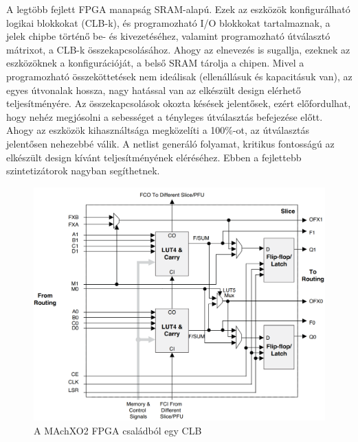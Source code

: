 \documentclass[a4paper,12pt,oneside]{book}
\begin{document}
A legtöbb fejlett FPGA manapság SRAM-alapú. Ezek az eszközök konfigurálható logikai blokkokat (CLB-k), és programozható I/O blokkokat tartalmaznak, a jelek chipbe történő be- és kivezetéséhez, valamint programozható útválasztó mátrixot, a CLB-k összekapcsolásához. Ahogy az elnevezés is sugallja, ezeknek az eszközöknek a konfigurációját, a belső SRAM tárolja a chipen. Mivel a programozható összeköttetések nem ideálisak (ellenállásuk és kapacitásuk van), az egyes útvonalak hossza, nagy hatással van az elkészült design elérhető teljesítményére. Az összekapcsolások okozta késések jelentősek, ezért előfordulhat, hogy nehéz megjósolni a sebességet a tényleges útválasztás befejezése előtt. Ahogy az eszközök kihasználtsága megközelíti a 100\%-ot, az útválasztás jelentősen nehezebbé válik. A netlist generáló folyamat, kritikus fontosságú az elkészült design kívánt teljesítményének eléréséhez. Ebben a fejlettebb szintetizátorok nagyban segíthetnek. 

\begin{figure}[H]
	\centering
	\includegraphics[trim=1mm 1mm 1mm 1mm,scale=0.38]{logickblockfromx02.png}
	\caption{A MAchXO2 FPGA családból egy CLB \cite{fpgaadatlap}}
	\label{CLB}
\end{figure}
\end{document}
